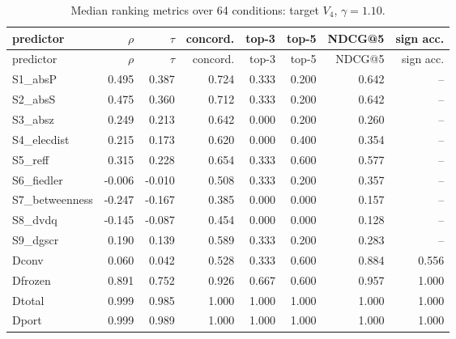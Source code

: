 \documentclass[10pt,a4paper]{article}
\begin{document}
{\scriptsize
\begin{longtable}{lrrrrrrr}
\caption{Median ranking metrics over 64 conditions: target $V_4$, $\gamma=1.10$.}\label{tab:s-bl-H4-1.1-FULL}\\
\toprule
predictor & $\rho$ & $\tau$ & concord. & top-3 & top-5 & NDCG@5 & sign acc. \\
\midrule
\endfirsthead
\toprule
predictor & $\rho$ & $\tau$ & concord. & top-3 & top-5 & NDCG@5 & sign acc. \\
\midrule
\endhead
S1\_absP & 0.495 & 0.387 & 0.724 & 0.333 & 0.200 & 0.642 & -- \\
S2\_absS & 0.475 & 0.360 & 0.712 & 0.333 & 0.200 & 0.642 & -- \\
S3\_absz & 0.249 & 0.213 & 0.642 & 0.000 & 0.200 & 0.260 & -- \\
S4\_elecdist & 0.215 & 0.173 & 0.620 & 0.000 & 0.400 & 0.354 & -- \\
S5\_reff & 0.315 & 0.228 & 0.654 & 0.333 & 0.600 & 0.577 & -- \\
S6\_fiedler & -0.006 & -0.010 & 0.508 & 0.333 & 0.200 & 0.357 & -- \\
S7\_betweenness & -0.247 & -0.167 & 0.385 & 0.000 & 0.000 & 0.157 & -- \\
S8\_dvdq & -0.145 & -0.087 & 0.454 & 0.000 & 0.000 & 0.128 & -- \\
S9\_dgscr & 0.190 & 0.139 & 0.589 & 0.333 & 0.200 & 0.283 & -- \\
Dconv & 0.060 & 0.042 & 0.528 & 0.333 & 0.600 & 0.884 & 0.556 \\
Dfrozen & 0.891 & 0.752 & 0.926 & 0.667 & 0.600 & 0.957 & 1.000 \\
Dtotal & 0.999 & 0.985 & 1.000 & 1.000 & 1.000 & 1.000 & 1.000 \\
Dport & 0.999 & 0.989 & 1.000 & 1.000 & 1.000 & 1.000 & 1.000 \\
\bottomrule
\end{longtable}}
\end{document}
